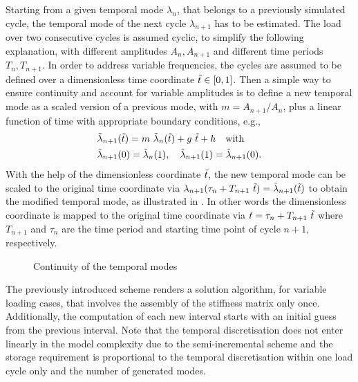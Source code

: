 Starting from a given temporal mode $\lambda_n$, that belongs to a previously simulated cycle, the temporal mode of the next cycle $\lambda_{n+1}$ has to be estimated. The load over two consecutive cycles is assumed cyclic, to simplify the following explanation, with different amplitudes $A_n, A_{n+1}$ and different time periods $T_n, T_{n+1}$. In order to address variable frequencies, the cycles are assumed to be defined over a dimensionless time coordinate ${\tilde{t}} \in [0,1]$. Then a simple way to ensure continuity and account for variable amplitudes is to define a new temporal mode as a scaled version of a previous mode, with $m={A_{n+1}}/{A_n}$, plus a linear function of time with appropriate boundary conditions, e.g.,
\begin{equation}
	\begin{split}
		&{\tilde{\lambda}}_{n+1}({\tilde{t}}) = m \  {\tilde{\lambda}}_n({\tilde{t}}) + g \  {\tilde{t}} + h \text{\quad with \quad}\\
		& {\tilde{\lambda}}_{n+1}(0) = {\tilde{\lambda}}_n(1) ,
		\quad
		{\tilde{\lambda}}_{n+1}(1) = {\tilde{\lambda}}_{n+1}(0).
	\end{split}
\end{equation}
With the help of the dimensionless coordinate ${\tilde{t}}$, the new temporal mode can be scaled to the original time coordinate via $\lambda_{n+1}(\tau_n + T_{n+1}\  {\tilde{t}}) = {\tilde{\lambda}}_{n+1}({\tilde{t}})$ to obtain the modified temporal mode, as illustrated in . In other words the dimensionless coordinate is mapped to the original time coordinate via $t = \tau_n + T_{n+1}\  {\tilde{t}}$ where $T_{n+1}$ and $\tau_n$ are the time period and starting time point of cycle $n+1$, respectively.
\begin{figure}[hbt!]
	\centering
	\hspace*{-1cm}
	
	\caption{Continuity of the temporal modes}
	\label{fig_time_mode_shift}
\end{figure}
The previously introduced scheme renders a solution algorithm, for variable loading cases, that involves the assembly of the stiffness matrix only once. Additionally, the computation of each new interval starts with an initial guess from the previous interval. Note that the temporal discretisation does not enter linearly in the model complexity due to the semi-incremental scheme and the storage requirement is proportional to the temporal discretisation within one load cycle only and the number of generated modes.

